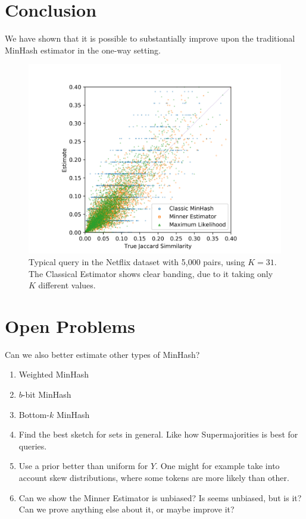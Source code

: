 
\section{Conclusion}

We have shown that it is possible to substantially improve upon the traditional MinHash estimator in the one-way setting.

\begin{figure}
   \centering
   \includegraphics[trim=10 0 10 30,clip,width=\linewidth]{figures/scatter}
   \caption{Typical query in the Netflix dataset with 5,000 pairs, using $K=31$.
      The Classical Estimator shows clear banding, due to it taking only $K$ different values.
   }
   \label{fig:scatter}
\end{figure}


\section{Open Problems}

Can we also better estimate other types of MinHash?
\begin{enumerate}
   \item Weighted MinHash
   \item $b$-bit MinHash
   \item Bottom-$k$ MinHash
   \item Find the best sketch for sets in general. Like how Supermajorities is best for queries.
   \item Use a prior better than uniform for $Y$.
      One might for example take into account skew distributions, where some tokens are more likely than other.
   \item Can we show the Minner Estimator is unbiased? Is seems unbiased, but is it?
      Can we prove anything else about it, or maybe improve it?
\end{enumerate}


